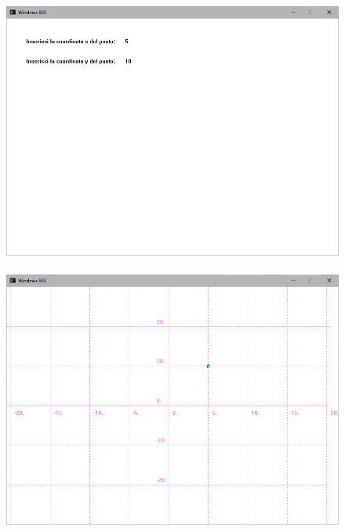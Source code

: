 \documentclass[12pt]{book}
\begin{document}
		
		\begin{figure}[h]
			\includegraphics[scale=0.5]{tracciapuntoterminale1}
			\\ \\
			\includegraphics[scale=0.5]{tracciapuntoterminale2}
		\end{figure}
		\clearpage
		\newpage
\end{document}
